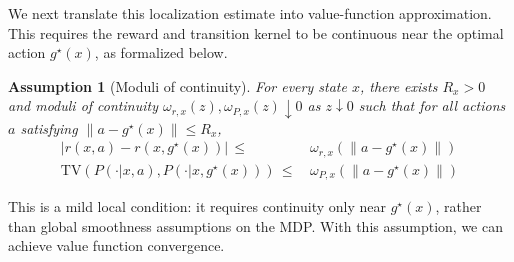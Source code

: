 \documentclass{article}
\newtheorem{asmp}{Assumption}[section]
\newcommand{\1}{\mathbbm{1}}
\newcommand{\TV}{\mathrm{TV}}
\newcommand{\renyuan}[1]{\textcolor{cyan}{[\textbf{renyuan}:#1]}}
\numberwithin{equation}{section}
\begin{document}

We next translate this localization estimate into value-function approximation.  This requires the reward and transition kernel to be continuous near the optimal action \(g^\star(x)\), as formalized below.
\begin{asmp}[Moduli of continuity]\label{ass:cont_env_soft}
 For every state $x$, there exists $R_{x}>0$ and moduli of continuity $\omega_{r, x}(z), \omega_{P, x}(z)\downarrow 0$ as $z\downarrow 0$ such that for all actions $a$ satisfying $\|a-g^\star(x)\|\leq R_{x}$,
\begin{align*}
|r(x, a)-r(x, g^\star(x))|\,\leq&\, \omega_{r,x}(\|a-g^\star(x)\|)\\
\TV\left(P(\cdot|x, a), P(\cdot|x, g^\star(x))\right)\,\leq&\, \omega_{P,x}(\|a-g^\star(x)\|)
\end{align*}
\end{asmp}
{This is a mild local condition: it requires continuity only near \(g^\star(x)\), rather than global %
smoothness assumptions on the MDP.} With this assumption, we can achieve value function convergence. 
\end{document}
